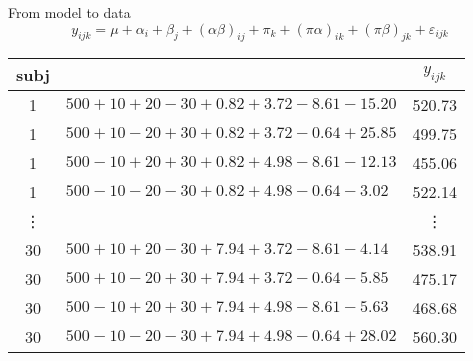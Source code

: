 \documentclass{beamer}
\begin{document}
\begin{frame}{From model to data}
      \[
        y_{ijk} = \mu + \alpha_i + \beta_j + (\alpha\beta)_{ij} + \pi_k +
        (\pi\alpha)_{ik} + (\pi\beta)_{jk} + \varepsilon_{ijk}
      \]

  \begin{tabular}{c|l|c}
    \hline
    subj &  & $y_{ijk}$ \\
    \hline
    1 & $500 + 10 + 20 - 30 + 0.82 + 3.72 - 8.61 - 15.20$ & 520.73\\
    1 & $500 + 10 - 20 + 30 + 0.82 + 3.72 - 0.64 + 25.85$ & 499.75\\
    1 & $500 - 10 + 20 + 30 + 0.82 + 4.98 - 8.61 - 12.13$ & 455.06\\
    1 & $500 - 10 - 20 - 30 + 0.82 + 4.98 - 0.64 - 3.02$  & 522.14\\
    \vdots &  & \vdots\\
    30 & $500 + 10 + 20 - 30 + 7.94 + 3.72 - 8.61 - 4.14$  & 538.91\\
    30 & $500 + 10 - 20 + 30 + 7.94 + 3.72 - 0.64 - 5.85$  & 475.17\\
    30 & $500 - 10 + 20 + 30 + 7.94 + 4.98 - 8.61 - 5.63$  & 468.68\\
    30 & $500 - 10 - 20 - 30 + 7.94 + 4.98 - 0.64 + 28.02$ & 560.30\\
    \hline
  \end{tabular}
  \vfill
\end{frame}
\end{document}
